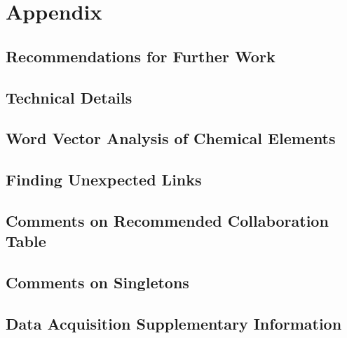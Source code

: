 \chapter{Appendix}
\section{Recommendations for Further Work}

\newpage
\section{Technical Details}

\newpage
\section{Word Vector Analysis of Chemical Elements}

\newpage
\section{Finding Unexpected Links}

\newpage
\section{Comments on Recommended Collaboration Table}

\newpage
\section{Comments on Singletons}

\newpage
\section{Data Acquisition Supplementary Information}

